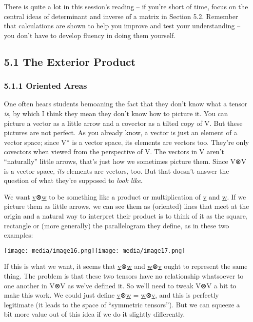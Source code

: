 \documentclass[oneside,english]{amsbook}
\numberwithin{section}{chapter}
\theoremstyle{plain}
\theoremstyle{definition}
\begin{document}
There is quite a lot in this session's reading -- if you're short of
time, focus on the central ideas of determinant and inverse of a matrix
in Section 5.2. Remember that calculations are shown to help you improve
and test your understanding -- you don't have to develop fluency in
doing them yourself.

\subsection{5.1 The Exterior Product}\label{the-exterior-product}

\subsubsection{5.1.1 Oriented Areas}\label{oriented-areas}

One often hears students bemoaning the fact that they don't know what a
tensor \emph{is}, by which I think they mean they don't know how to
picture it. You can picture a vector as a little arrow and a covector as
a tilted copy of V. But these pictures are not perfect. As you already
know, a vector is just an element of a vector space; since V* is a
vector space, its elements are vectors too. They're only covectors when
viewed from the perspective of V. The vectors in V aren't ``naturally''
little arrows, that's just how we sometimes picture them. Since V⊗V is a
vector space, \emph{its} elements are vectors, too. But that doesn't
answer the question of what they're supposed to \emph{look like}.

We want \ul{v}⊗\ul{w} to be something like a product or multiplication
of \ul{v} and \ul{w}. If we picture them as little arrows, we can see
them as (oriented) lines that meet at the origin and a natural way to
interpret their product is to think of it as the square, rectangle or
(more generally) the parallelogram they define, as in these two
examples:

\texttt{[image: media/image16.png]}\texttt{[image: media/image17.png]}

If this is what we want, it seems that \ul{v}⊗\ul{w} and \ul{w}⊗\ul{v}
ought to represent the same thing. The problem is that these two tensors
have no relationship whatsoever to one another in V⊗V as we've defined
it. So we'll need to tweak V⊗V a bit to make this work. We could just
define \ul{v}⊗\ul{w} = \ul{w}⊗\ul{v}, and this is perfectly legitimate
(it leads to the space of ``symmetric tensors''). But we can squeeze a
bit more value out of this idea if we do it slightly differently.
\end{document}
